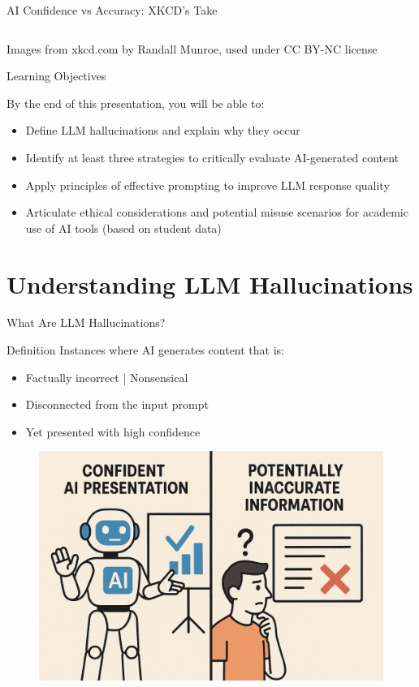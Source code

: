 \documentclass{beamer}
\begin{document}
\begin{frame}{AI Confidence vs Accuracy: XKCD's Take}
\begin{columns}
\begin{column}{0.48\textwidth}
    \end{column}
  \end{columns}
  \vspace{0.5cm}
  {\tiny Images from xkcd.com by Randall Munroe, used under CC BY-NC license}
\end{frame}

\begin{frame}{Learning Objectives}
\begin{block}{By the end of this presentation, you will be able to:}
\begin{itemize}
  \item{} Define LLM hallucinations and explain why they occur
  \item{} Identify at least three strategies to critically evaluate AI-generated content
  \item{} Apply principles of effective prompting to improve LLM response quality
  \item{} Articulate ethical considerations and potential misuse scenarios for academic use of AI tools (based on student data)
\end{itemize}
\end{block}
\end{frame}

\section{Understanding LLM Hallucinations}

\begin{frame}{What Are LLM Hallucinations?}
\begin{block}{Definition}
Instances where AI generates content that is:
\begin{itemize}
  \item Factually incorrect | Nonsensical
  \item Disconnected from the input prompt
  \item Yet presented with high confidence
\end{itemize}
\end{block}

\alert{} %
\begin{figure}
    \centering
    \includegraphics[width=0.5\linewidth]{cs12-ai-hallucination_example.png}
\end{figure}
\end{frame}
\end{document}
